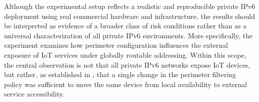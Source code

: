 Although the experimental setup reflects a realistic and reproducible private IPv6 deployment using real commercial hardware and infrastructure, the results should be interpreted as evidence of a broader class of risk conditions rather than as a universal characterization of all private IPv6 environments. More specifically, the experiment examines how perimeter configuration influences the external exposure of IoT services under globally routable addressing. Within this scope, the central observation is not that all private IPv6 networks expose IoT devices, but rather, as established in , that a single change in the perimeter filtering policy was sufficient to move the same device from local availability to external service accessibility.